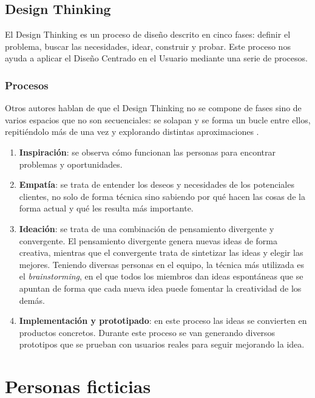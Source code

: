 \subsection{Design Thinking}

El Design Thinking es un proceso de diseño descrito en cinco fases\cite{designThinkingPlattner}: definir el problema, buscar las necesidades, idear, construir y probar. Este proceso nos ayuda a aplicar el Diseño Centrado en el Usuario mediante una serie de procesos.

\subsubsection{Procesos}

Otros autores hablan de que el Design Thinking no se compone de fases sino de varios espacios que no son secuenciales: se solapan y se forma un bucle entre ellos, repitiéndolo más de una vez y explorando distintas aproximaciones \cite{designThinkingBrown}.

\begin{enumerate}
    \item \textbf{Inspiración}: se observa cómo funcionan las personas para encontrar problemas y oportunidades.
    \item \textbf{Empatía}: se trata de entender los deseos y necesidades de los potenciales clientes, no solo de forma técnica sino sabiendo por qué hacen las cosas de la forma actual y qué les resulta más importante.
    \item \textbf{Ideación}: se trata de una combinación de pensamiento divergente y convergente. El pensamiento divergente genera nuevas ideas de forma creativa, mientras que el convergente trata de sintetizar las ideas y elegir las mejores.
    Teniendo diversas personas en el equipo, la técnica más utilizada es el \textit{brainstorming}, en el que todos los miembros dan ideas espontáneas que se apuntan de forma que cada nueva idea puede fomentar la creatividad de los demás.
    \item \textbf{Implementación y prototipado}: en este proceso las ideas se convierten en productos concretos. Durante este proceso se van generando diversos prototipos que se prueban con usuarios reales para seguir mejorando la idea.
\end{enumerate}


\section{Personas ficticias}\label{section:personasFicticias}

